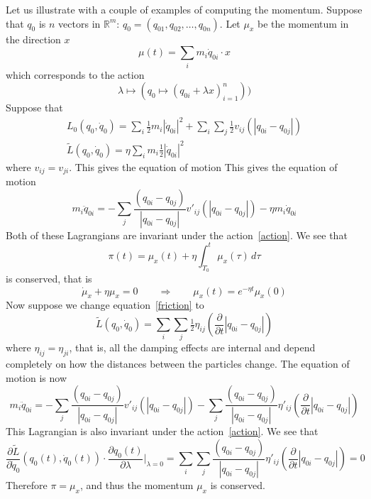 \documentclass{amsart}
\begin{document}
Let us illustrate with a couple of examples of computing the momentum.  Suppose that $q_0$ is $n$ vectors in $\mathbb R^m$: $q_0 = (q_{01},q_{02},\dots,q_{0n})$.
Let $\mu_x$ be the momentum in the direction $x$
\begin{equation}
\mu(t) = \sum_i m_i \dot q_{0i} \cdot x
\end{equation}
which corresponds to the action
\begin{equation}
\label{action}
\lambda \mapsto (q_0 \mapsto (q_{0i} + \lambda x)_{i=1}^n))
\end{equation}
Suppose that
\begin{gather}
L_0(q_0,\dot q_0) = \sum_i \tfrac12 m_i|\dot q_{0i}|^2 + \sum_i \sum_j \tfrac12 v_{ij}(|q_{0i}-q_{0j}|) \\
\label{friction}
\tilde L(q_0,\dot q_0) = \eta \sum_i m_i \tfrac12 |\dot q_{0i}|^2
\end{gather}
where $v_{ij} = v_{ji}$.  This gives the equation of motion
This gives the equation of motion
\begin{equation}
m_i \ddot q_{0i} = - \sum_j \frac{(q_{0i}-q_{0j})}{|q_{0i}-q_{0j}|} v'_{ij}(|q_{0i}-q_{0j}|) - \eta m_i \dot q_{0i}
\end{equation}
Both of these Lagrangians are invariant under the action~\eqref{action}.  We see that
\begin{equation}
\pi(t) = \mu_x(t) + \eta \int_{T_0}^t \mu_x(\tau) \, d\tau
\end{equation}
is conserved, that is
\begin{equation}
\dot \mu_x + \eta \mu_x = 0 \qquad \Rightarrow \qquad \mu_x(t) = e^{-\eta t} \mu_x(0)
\end{equation}
Now suppose we change equation~\eqref{friction} to
\begin{equation}
\label{friction2}
\tilde L(q_0,\dot q_0) = \sum_i \sum_j \tfrac12 \eta_{ij}\left(\frac{\partial}{\partial t}|q_{0i}-q_{0j}|\right)
\end{equation}
where $\eta_{ij} = \eta_{ji}$, that is, all the damping effects are internal and depend completely on how the distances between the particles change.  The equation of motion is now
\begin{equation}
m_i \ddot q_{0i} = - \sum_j \frac{(q_{0i}-q_{0j})}{|q_{0i}-q_{0j}|} v'_{ij}(|q_{0i}-q_{0j}|) - \sum_j \frac{(q_{0i}-q_{0j})}{|q_{0i}-q_{0j}|} \eta'_{ij}\left(\frac\partial{\partial t}|q_{0i}-q_{0j}|\right)
\end{equation}
This Lagrangian is also invariant under the action~\eqref{action}.  We see that
\begin{equation}
\frac{\partial \tilde L}{\partial \dot q_0}(q_0(t),\dot q_0(t)) \cdot \frac{\partial q_0(t)}{\partial \lambda}\Big|_{\lambda = 0} = \sum_i \sum_j \frac{(q_{0i}-q_{0j})}{|q_{0i}-q_{0j}|} \eta'_{ij}\left(\frac\partial{\partial t}|q_{0i}-q_{0j}|\right) = 0
\end{equation}
Therefore $\pi = \mu_x$, and thus the momentum $\mu_x$ is conserved.
\end{document}
